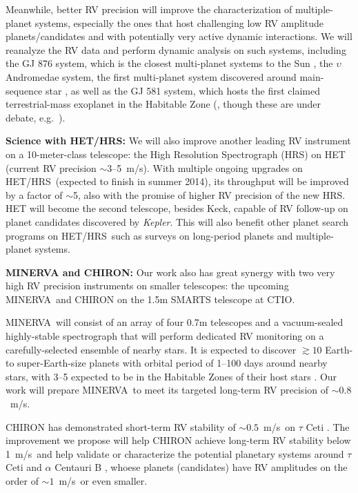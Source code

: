 \documentclass[12pt]{article}
\def\mps{m/s}
\def\kepler{{\it Kepler}}
\def\minerva{MINERVA}
\def\hrs{HET/HRS}
\begin{document}
Meanwhile, better RV precision will improve the characterization of
multiple-planet systems, especially the ones that host challenging low
RV amplitude planets/candidates and with potentially very active
dynamic interactions. We will reanalyze the RV data and perform
dynamic analysis on such systems, including the GJ 876 system, which
is the closest multi-planet systems to the Sun
\citep{marcy2001,rivera2005,rivera2010}, the $\upsilon$ Andromedae
system, the first multi-planet system discovered around main-sequence
star \citep{butler1999,wright2009,curiel2011}, as well as the GJ 581
system, which hosts the first claimed terrestrial-mass exoplanet in
the Habitable Zone (\citealt{vogt2010}, though these are under debate,
e.g.~\citealt{gregory2011,vogt2012,robertson2013}).

\textbf{Science with \hrs: } We will also improve another leading RV
instrument on a 10-meter-class telescope: the High Resolution
Spectrograph (HRS) on HET (current RV precision $\sim$3--5~\mps). With
multiple ongoing upgrades on \hrs\ (expected to finish in summer
2014), its throughput will be improved by a factor of $\sim$5, also
with the promise of higher RV precision of the new HRS. HET will
become the second telescope, besides Keck, capable of RV follow-up on
planet candidates discovered by \kepler. This will also benefit other
planet search programs on \hrs\ such as surveys on long-period planets
and multiple-planet systems.

\textbf{MINERVA and CHIRON: } Our work also has great synergy with two
very high RV precision instruments on smaller telescopes: the upcoming
\minerva\ and CHIRON on the 1.5m SMARTS telescope at CTIO. 

\minerva\ will consist of an array of four 0.7m telescopes and a
vacuum-sealed highly-stable spectrograph that will perform dedicated
RV monitoring on a carefully-selected ensemble of nearby stars. It is
expected to discover $\gtrsim 10$ Earth- to super-Earth-size planets
with orbital period of 1--100 days around nearby stars, with 3--5
expected to be in the Habitable Zones of their host stars
\citep{bottom2013,hogstrom2013}. Our work will prepare \minerva\ to
meet its targeted long-term RV precision of $\sim 0.8$~\mps.

CHIRON has demonstrated short-term RV stability of $\sim0.5$~\mps\ on
$\tau$ Ceti \citep{chiron2013}. The improvement we propose will help
CHIRON achieve long-term RV stability below 1~\mps\ and help validate
or characterize the potential planetary systems around $\tau$ Ceti
\citep{tuomi2013} and $\alpha$ Centauri B
\citep{dumusque2012,hatzes2013}, whoese planets (candidates) have RV
amplitudes on the order of $\sim 1$~\mps\ or even smaller.
\end{document}
